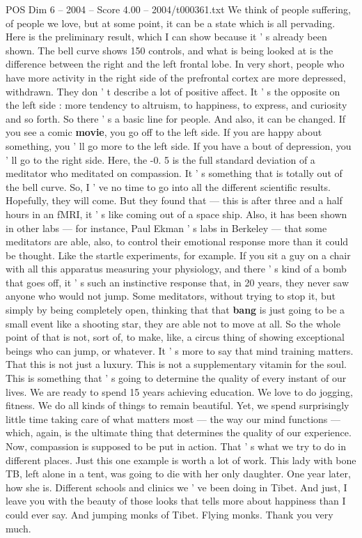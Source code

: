 \begin{textsample}{POS Dim 6 – 2004 – Score 4.00 – 2004/t000361.txt}
We think of people suffering, of people we love, but at some point, it can be a state which is all pervading.
Here is the preliminary result, which I can show because it ' s already been shown.
The bell curve shows 150 controls, and what is being looked at is the difference between the right and the left frontal lobe.
In very short, people who have more activity in the right side of the prefrontal cortex are more depressed, withdrawn.
They don ' t describe a lot of positive affect.
It ' s the opposite on the left side : more tendency to altruism, to happiness, to express, and curiosity and so forth.
So there ' s a basic line for people.
And also, it can be changed.
If you see a comic \textbf{movie}, you go off to the left side.
If you are happy about something, you ' ll go more to the left side.
If you have a bout of depression, you ' ll go to the right side.
Here, the -0. 5 is the full standard deviation of a meditator who meditated on compassion.
It ' s something that is totally out of the bell curve.
So, I ' ve no time to go into all the different scientific results.
Hopefully, they will come.
But they found that — this is after three and a half hours in an fMRI, it ' s like coming out of a space ship.
Also, it has been shown in other labs — for instance, Paul Ekman ' s labs in Berkeley — that some meditators are able, also, to control their emotional response more than it could be thought.
Like the startle experiments, for example.
If you sit a guy on a chair with all this apparatus measuring your physiology, and there ' s kind of a bomb that goes off, it ' s such an instinctive response that, in 20 years, they never saw anyone who would not jump.
Some meditators, without trying to stop it, but simply by being completely open, thinking that that \textbf{bang} is just going to be a small event like a shooting star, they are able not to move at all.
So the whole point of that is not, sort of, to make, like, a circus thing of showing exceptional beings who can jump, or whatever.
It ' s more to say that mind training matters.
That this is not just a luxury.
This is not a supplementary vitamin for the soul.
This is something that ' s going to determine the quality of every instant of our lives.
We are ready to spend 15 years achieving education.
We love to do jogging, fitness.
We do all kinds of things to remain beautiful.
Yet, we spend surprisingly little time taking care of what matters most — the way our mind functions — which, again, is the ultimate thing that determines the quality of our experience.
Now, compassion is supposed to be put in action.
That ' s what we try to do in different places.
Just this one example is worth a lot of work.
This lady with bone TB, left alone in a tent, was going to die with her only daughter.
One year later, how she is.
Different schools and clinics we ' ve been doing in Tibet.
And just, I leave you with the beauty of those looks that tells more about happiness than I could ever say.
And jumping monks of Tibet.
Flying monks.
Thank you very much.

\end{textsample}
